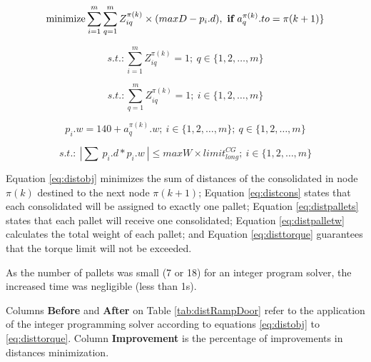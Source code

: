 \documentclass[preprint,authoryear]{elsarticle}
\begin{document}
\begin{equation} \label{eq:distobj}
	\mbox{minimize} \sum_{i=1}^{m} \sum_{q=1}^{m} Z^{\pi(k)}_{iq} \times ( maxD - p_i.d) ,\ \mbox{{\bf if}}\ a^{\pi(k)}_q.to = \pi(k+1) \}
\end{equation}

\begin{equation} \label{eq:distcons}
	s.t.: \sum_{i=1}^{m} Z^{\pi(k)}_{iq} = 1;\ q \in \{1,2,\ldots,m\}
\end{equation}

\begin{equation} \label{eq:distpallets}
	s.t.: \sum_{q=1}^{m} Z^{\pi(k)}_{iq}=1;\ i \in \{1,2,\ldots,m\}
\end{equation}

\begin{equation} \label{eq:distpalletw}
	p_i.w = 140 + a^{\pi(k)}_q.w ;\ i \in \{1,2,\ldots,m\};\ q \in \{1,2,\ldots,m\}
\end{equation}

\begin{equation} \label{eq:disttorque}
	s.t.:\ | \sum\ p_i.d * p_i.w\ | \leq maxW \times limit^{CG}_{long} ;\ i \in \{1,2,\ldots,m\}
\end{equation}

Equation \ref{eq:distobj} minimizes the sum of distances of the consolidated in node $\pi(k)$ destined to the next node $\pi(k+1)$; Equation \ref{eq:distcons} states that each consolidated will be assigned to exactly one pallet; Equation \ref{eq:distpallets} states that each pallet will receive one consolidated; Equation \ref{eq:distpalletw} calculates the total weight of each pallet; and Equation \ref{eq:disttorque} guarantees that the torque limit will not be exceeded. 

As the number of pallets was small (7 or 18) for an integer program solver, the increased time was negligible (less than 1s).

Columns {\bf Before} and {\bf After} on Table \ref{tab:distRampDoor} refer to the application of the integer programming solver according to equations \ref{eq:distobj} to \ref{eq:disttorque}. Column {\bf Improvement} is the percentage of improvements in distances minimization.

\vspace{2.0mm}
\end{document}
